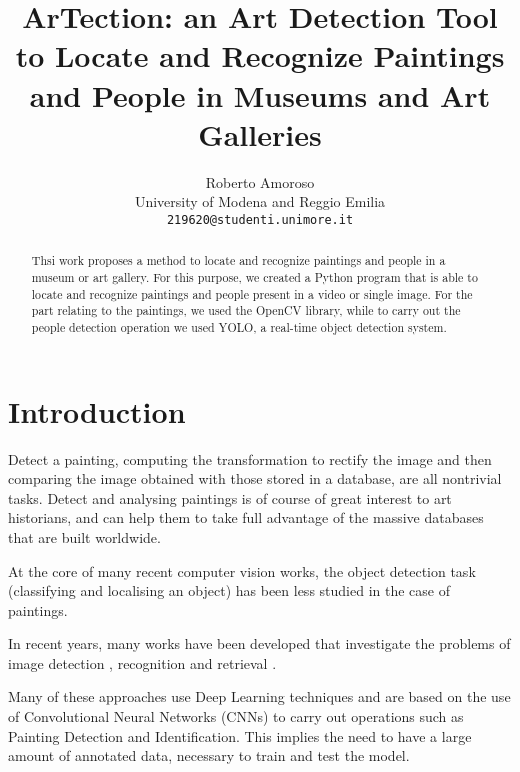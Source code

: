 \documentclass[10pt,twocolumn,letterpaper]{article}
\begin{document}
\title{ ArTection: an Art Detection Tool to Locate and Recognize Paintings and People in Museums and Art Galleries}

\author{Roberto Amoroso\\
University of Modena and Reggio Emilia\\
{\tt\small 219620@studenti.unimore.it}
}

\maketitle

\begin{abstract}
   Thsi work proposes a method to locate and recognize paintings and people in a museum or art gallery. For this purpose, we created a Python program that is able to locate and recognize paintings and people present in a video or single image. For the part relating to the paintings, we used the OpenCV library, while to carry out the people detection operation we used YOLO, a real-time object detection system.
\end{abstract}

\section{Introduction}
Detect a painting, computing the transformation to rectify the image and then comparing the image obtained with those stored in a database, are all nontrivial tasks. Detect and analysing paintings is of course of great interest to art historians, and can help them to take full advantage of the massive databases that are built worldwide.

At the core of many recent computer vision works, the object detection task (classifying and localising an object) has
been less studied in the case of paintings.

In recent years, many works have been developed that investigate the problems of image detection \cite{fathy1995image,hambly2001supercosmos}, recognition \cite{martinel2013robust} and retrieval \cite{rui1999image}. 

Many of these approaches use Deep Learning techniques and are based on the use of Convolutional Neural Networks (CNNs) to carry out operations such as Painting Detection and Identification\cite{hong2019art}. This implies the need to have a large amount of annotated data, necessary to train and test the model.
\end{document}
